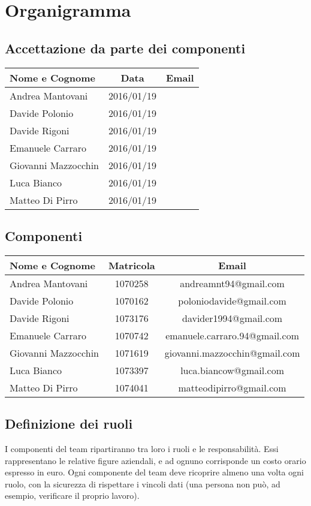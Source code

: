 \section*{Organigramma} %
\subsection*{Accettazione da parte dei componenti}
\begin{center}
  \begin{tabular}{ l | c | c }
    \hline
    \textbf{Nome e Cognome} & \textbf{Data} & \textbf{Email} \\
    \hline
    Andrea Mantovani & 2016/01/19 &  \\ \hline
    Davide Polonio & 2016/01/19 &  \\ \hline
    Davide Rigoni & 2016/01/19 &  \\ \hline
    Emanuele Carraro & 2016/01/19 &  \\ \hline
    Giovanni Mazzocchin & 2016/01/19 &  \\ \hline
    Luca Bianco & 2016/01/19 &  \\ \hline
    Matteo Di Pirro & 2016/01/19 &  \\
    \hline
  \end{tabular}
\end{center}


\subsection*{Componenti}
\begin{center}
  \begin{tabular}{ l | c | c }
    \hline
    \textbf{Nome e Cognome} & \textbf{Matricola} & \textbf{Email} \\
    \hline
    Andrea Mantovani & 1070258 & andreamnt94@gmail.com \\ \hline
    Davide Polonio & 1070162 & poloniodavide@gmail.com \\ \hline
    Davide Rigoni & 1073176 & davider1994@gmail.com \\ \hline
    Emanuele Carraro & 1070742 & emanuele.carraro.94@gmail.com \\ \hline
    Giovanni Mazzocchin & 1071619 & giovanni.mazzocchin@gmail.com \\ \hline
    Luca Bianco & 1073397 & luca.biancow@gmail.com \\ \hline
    Matteo Di Pirro & 1074041 & matteodipirro@gmail.com \\
    \hline
  \end{tabular}
\end{center}



\subsection*{Definizione dei ruoli}
I componenti del team ripartiranno tra loro i ruoli e le responsabilit\`a. Essi rappresentano le relative figure aziendali, e ad ognuno corrisponde un costo orario espresso in euro.
Ogni componente del team deve ricoprire almeno una volta ogni ruolo, con la sicurezza di rispettare i vincoli dati (una persona non pu\`o, ad esempio, verificare il proprio lavoro).
